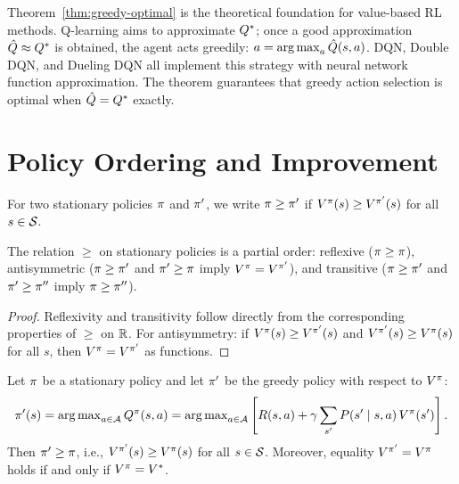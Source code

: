 \documentclass[11pt,a4paper]{article}
\begin{document}
\begin{rlconnection}[title={Greedy Policies in RL Algorithms}]
Theorem~\ref{thm:greedy-optimal} is the theoretical foundation for
value-based RL methods. Q-learning aims to approximate $Q^*$;
once a good approximation $\hat{Q} \approx Q^*$ is obtained, the
agent acts greedily: $a = \operatorname{arg\,max}_a \hat{Q}(s,a)$. DQN, Double DQN,
and Dueling DQN all implement this strategy with neural network
function approximation. The theorem guarantees that greedy action
selection is optimal when $\hat{Q} = Q^*$ exactly.
\end{rlconnection}


\section{Policy Ordering and Improvement}
\label{sec:policy-ordering}

\begin{definition}
\label{def:policy-ordering}
For two stationary policies $\pi$ and $\pi'$, we write
$\pi \geq \pi'$ if $V^{\pi}(s) \geq V^{\pi'}(s)$ for all
$s \in \mathcal{S}$.
\end{definition}

\begin{proposition}
\label{prop:partial-order}
The relation $\geq$ on stationary policies is a partial order:
reflexive ($\pi \geq \pi$), antisymmetric ($\pi \geq
\pi'$ and $\pi' \geq \pi$ imply $V^{\pi} = V^{\pi'}$),
and transitive ($\pi \geq \pi'$ and $\pi' \geq \pi''$
imply $\pi \geq \pi''$).
\end{proposition}

\begin{proof}
Reflexivity and transitivity follow directly from the corresponding
properties of $\geq$ on $\mathbb{R}$. For antisymmetry: if
$V^{\pi}(s) \geq V^{\pi'}(s)$ and $V^{\pi'}(s) \geq V^{\pi}(s)$
for all $s$, then $V^{\pi} = V^{\pi'}$ as functions.
\end{proof}

\begin{theorem}
\label{thm:policy-improvement}
Let $\pi$ be a stationary policy and let $\pi'$ be the greedy
policy with respect to $V^{\pi}$:
\[
    \pi'(s) = \operatorname{arg\,max}_{a \in \mathcal{A}} Q^{\pi}(s,a)
    = \operatorname{arg\,max}_{a \in \mathcal{A}} \left[ R(s,a) + \gamma
    \sum_{s'} P(s' \mid s,a)\, V^{\pi}(s') \right].
\]
Then $\pi' \geq \pi$, i.e.,
$V^{\pi'}(s) \geq V^{\pi}(s)$ for all $s \in \mathcal{S}$. Moreover,
equality $V^{\pi'} = V^{\pi}$ holds if and only if $V^{\pi} = V^*$.
\end{theorem}
\end{document}
